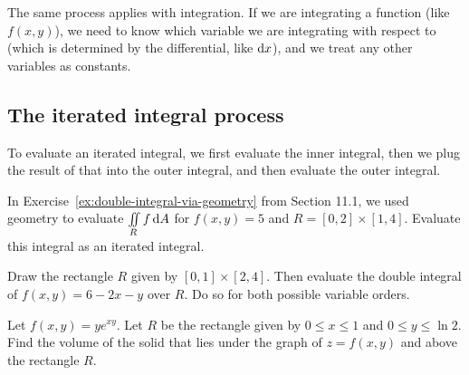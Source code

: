 The same process applies with integration. If we are integrating a function (like $f(x,y)$), we need to know which variable we are integrating with respect to (which is determined by the differential, like $\mathop{}\!\mathrm{d} x$), and we treat any other variables as constants.

\pagebreak 

\subsection{The iterated integral process}
To evaluate an iterated integral, we first evaluate the inner integral, then we plug the result of that into the outer integral, and then evaluate the outer integral.

\begin{ex}
    In Exercise~\ref{ex:double-integral-via-geometry} from Section 11.1, we used geometry to evaluate $\iint\limits_R f\mathop{}\!\mathrm{d} A$ for $f(x,y)=5$ and $R=[0,2]\times[1,4]$. Evaluate this integral as an iterated integral.
\end{ex}

\vfill 

\begin{ex}
    Draw the rectangle $R$ given by $[0,1]\times[2,4]$. Then evaluate the double integral of $f(x,y)=6-2x-y$ over $R$. Do so for both possible variable orders.
\end{ex}

\vfill \vfill 

\pagebreak 

\begin{ex}
    Let $f(x,y)=ye^{xy}$. Let $R$ be the rectangle given by $0\le x\le 1$ and $0\le y\le\ln2$. Find the volume of the solid that lies under the graph of $z=f(x,y)$ and above the rectangle $R$. %
\end{ex}
